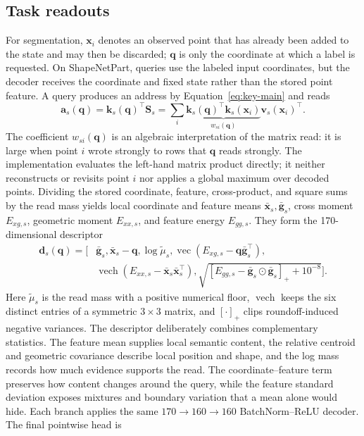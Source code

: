 \documentclass[times,twocolumn,final,authoryear]{elsarticle}
\newcommand{\Sstate}{\mathbf{S}}
\newcommand{\vect}{\operatorname{vec}}
\begin{document}
\subsection{Task readouts}
For segmentation, $\bm x_i$ denotes an observed point that has already been added to the state and may then be discarded; $\bm q$ is only the coordinate at which a label is requested. On ShapeNetPart, queries use the labeled input coordinates, but the decoder receives the coordinate and fixed state rather than the stored point feature. A query produces an address by Equation~\eqref{eq:key-main} and reads
\begin{equation}
\bm a_s(\bm q)=\bm k_s(\bm q)^\top\Sstate_s
=\sum_i \underbrace{\bm k_s(\bm q)^\top\bm k_s(\bm x_i)}_{w_{si}(\bm q)}
\bm v_s(\bm x_i)^\top .
\label{eq:effective-read-main}
\end{equation}
The coefficient $w_{si}(\bm q)$ is an algebraic interpretation of the matrix read: it is large when point $i$ wrote strongly to rows that $\bm q$ reads strongly. The implementation evaluates the left-hand matrix product directly; it neither reconstructs or revisits point $i$ nor applies a global maximum over decoded points. Dividing the stored coordinate, feature, cross-product, and square sums by the read mass yields local coordinate and feature means $\bar{\bm x}_s,\bar{\bm g}_s$, cross moment $E_{xg,s}$, geometric moment $E_{xx,s}$, and feature energy $E_{gg,s}$. They form the 170-dimensional descriptor
\begin{equation}
\begin{aligned}
\bm d_s(\bm q)=[&\bar{\bm g}_s,\bar{\bm x}_s-\bm q,\log\widetilde\mu_s,
\vect(E_{xg,s}-\bm q\bar{\bm g}_s^\top),\\
&\operatorname{vech}(E_{xx,s}-\bar{\bm x}_s\bar{\bm x}_s^\top),
\sqrt{[E_{gg,s}-\bar{\bm g}_s\odot\bar{\bm g}_s]_++10^{-8}}].
\end{aligned}
\label{eq:query-descriptor-main}
\end{equation}
Here $\widetilde\mu_s$ is the read mass with a positive numerical floor, $\operatorname{vech}$ keeps the six distinct entries of a symmetric $3\times3$ matrix, and $[\cdot]_+$ clips roundoff-induced negative variances. The descriptor deliberately combines complementary statistics. The feature mean supplies local semantic content, the relative centroid and geometric covariance describe local position and shape, and the log mass records how much evidence supports the read. The coordinate--feature term preserves how content changes around the query, while the feature standard deviation exposes mixtures and boundary variation that a mean alone would hide. Each branch applies the same $170\rightarrow160\rightarrow160$ BatchNorm--ReLU decoder. The final pointwise head is
\end{document}
